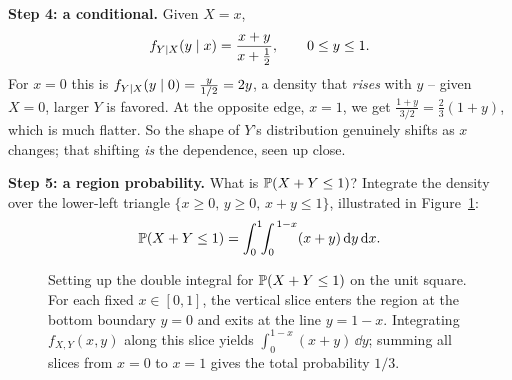 \begin{example}
\textbf{Step 4: a conditional.} Given $X = x$,
\[
  f_{Y\given X}(y\given x) = \frac{x+y}{x+\tfrac12}, \qquad 0\le y\le 1.
\]
For $x = 0$ this is $f_{Y\given X}(y\given 0) = \frac{y}{1/2} = 2y$, a density
that \emph{rises} with $y$ -- given $X=0$, larger $Y$ is favored. At the
opposite edge, $x = 1$, we get
$\frac{1+y}{3/2} = \tfrac23(1+y)$, which is much flatter. So the shape of $Y$'s
distribution genuinely shifts as $x$ changes; that shifting \emph{is} the
dependence, seen up close.

\textbf{Step 5: a region probability.} What is $\P(X+Y \le 1)$? Integrate the
density over the lower-left triangle $\{x\ge0,\,y\ge0,\,x+y\le1\}$, illustrated
in Figure~\ref{ch13:fig-region-triangle}:
\[
  \P(X+Y\le 1) = \int_0^1\!\!\int_0^{\,1-x}(x+y)\,\dd y\,\dd x.
\]

\begin{figure}[H]
\centering
{}
\caption{Setting up the double integral for $\P(X+Y\le 1)$ on the unit square.
For each fixed $x \in [0,1]$, the vertical slice enters the region at the bottom
boundary $y=0$ and exits at the line $y=1-x$. Integrating $f_{X,Y}(x,y)$ along this
slice yields $\int_0^{1-x}(x+y)\,\dd y$; summing all slices from $x=0$ to $x=1$ gives
the total probability $1/3$.}
\label{ch13:fig-region-triangle}
\end{figure}


\end{example}
